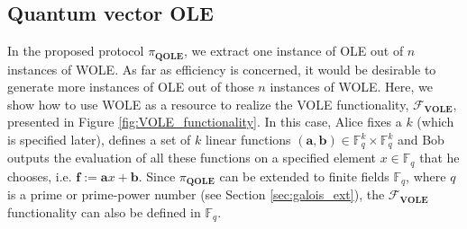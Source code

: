 \subsection{Quantum vector OLE}
\label{sec:qvole}
In the proposed protocol $\pi_{\textbf{QOLE}}$, we extract one instance of OLE out of $n$ instances of WOLE. As far as efficiency is concerned, it would be desirable to generate more instances of OLE out of those $n$ instances of WOLE. Here, we show how to use WOLE as a resource to realize the VOLE functionality, $\mathcal{F}_{\textbf{VOLE}}$, presented in Figure \ref{fig:VOLE_functionality}. In this case, Alice  fixes a $k$ (which is specified later), defines a set of $k$ linear functions $(\bm{a}, \bm{b})\in\mathbb{F}^k_q\times\mathbb{F}^k_q$ and Bob outputs the evaluation of all these functions on a specified element $x\in\mathbb{F}_q$ that he chooses, i.e. $\bm{f}:=\bm{a} x+ \bm{b}$. Since  $\pi_{\textbf{QOLE}}$ can be extended to finite fields $\mathbb{F}_q$, where $q$ is a prime or prime-power number (see Section \ref{sec:galois_ext}), the $\mathcal{F}_{\textbf{VOLE}}$ functionality can also be defined in $\mathbb{F}_q$. 

